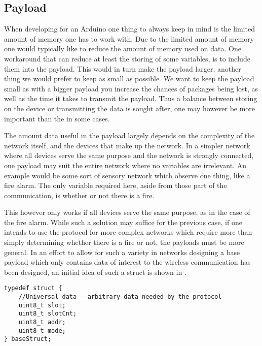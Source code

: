 \subsection{Payload}
When developing for an Arduino one thing to always keep in mind is the limited amount of memory one has to work with.
Due to the limited amount of memory one would typically like to reduce the amount of memory used on data.
One workaround that can reduce at least the storing of some variables, is to include them into the payload.
This would in turn make the payload larger, another thing we would prefer to keep as small as possible.
We want to keep the payload small as with a bigger payload you increase the chances of packages being lost, as well as the time it takes to transmit the payload. 
Thus a balance between storing on the device or transmitting the data is sought after, one may however be more important than the in some cases.

\bigskip \noindent
The amount data useful in the payload largely depends on the complexity of the network itself, and the devices that make up the network.
In a simpler network where all devices serve the same purpose and the network is strongly connected, one payload may suit the entire network where no variables are irrelevant.
An example would be some sort of sensory network which observe one thing, like a fire alarm.
The only variable required here, aside from those part of the communication, is whether or not there is a fire.

This however only works if all devices serve the same purpose, as in the case of the fire alarm.
While such a solution may suffice for the previous case, if one intends to use the protocol for more complex networks which require more than simply determining whether there is a fire or not, the payloads must be more general.
In an effort to allow for such a variety in networks designing a base payload which only contains data of interest to the wireless communication has been designed, an initial idea of such a struct is shown in .

\bigskip \noindent
\lstset{style=customc}
\begin{lstlisting}[style=customc,caption={Possible way the baseStruct could look for the payload},label={baseStruct}]
typedef struct {
    //Universal data - arbitrary data needed by the protocol
    uint8_t slot;
    uint8_t slotCnt;
    uint8_t addr;
    uint8_t mode;
} baseStruct;
\end{lstlisting}
\bigskip \noindent

